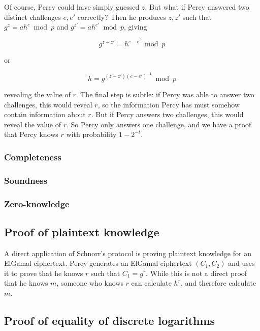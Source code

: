 \documentclass[11pt,twoside,a4paper]{article}
\theoremstyle{definition}
\begin{document}
Of course, Percy could have simply guessed \(z\). But what if Percy answered two distinct challenges \(e,e'\) correctly? Then he produces \(z,z'\) such that \(g^z=ah^e\bmod p\) and \(g^{z'}=ah^{e'}\bmod p\), giving

\[g^{z-z'}=h^{e-e'}\bmod p\]

or

\[h=g^{(z-z')(e-e')^{-1}}\bmod p\]

revealing the value of \(r\). The final step is subtle: if Percy was able to answer two challenges, this would reveal \(r\), so the information Percy has must somehow contain information about \(r\). But if Percy answers two challenges, this would reveal the value of \(r\). So Percy only answers one challenge, and we have a proof that Percy knows \(r\) with probability \(1-2^{-t}\).

\subsubsection{Completeness}
\subsubsection{Soundness}
\subsubsection{Zero-knowledge}
\subsection{Proof of plaintext knowledge}
A direct application of Schnorr's protocol is proving plaintext knowledge for an ElGamal ciphertext. Percy generates an ElGamal ciphertext \((C_1, C_2)\) and uses it to prove that he knows \(r\) such that \(C_1=g^r\). While this is not a direct proof that he knows \(m\), someone who knows \(r\) can calculate \(h^r\), and therefore calculate \(m\).

\subsection{Proof of equality of discrete logarithms}
\end{document}
